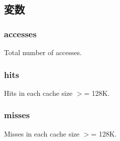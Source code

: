 \subsection{変数}
\hypertarget{group__FALRUStats_ga60db2c0b2a8e7ec99712db305f2adf5d}{
\subsubsection[{accesses}]{ accesses}}
\label{group__FALRUStats_ga60db2c0b2a8e7ec99712db305f2adf5d}
Total number of accesses. \hypertarget{group__FALRUStats_ga9fa327cedfd790f651b9218d749c7c73}{
\subsubsection[{hits}]{ hits}}
\label{group__FALRUStats_ga9fa327cedfd790f651b9218d749c7c73}
Hits in each cache size $>$= 128K. \hypertarget{group__FALRUStats_gadc50dd8bb92cf864a73d259ac6c67ecd}{
\subsubsection[{misses}]{ misses}}
\label{group__FALRUStats_gadc50dd8bb92cf864a73d259ac6c67ecd}
Misses in each cache size $>$= 128K. 